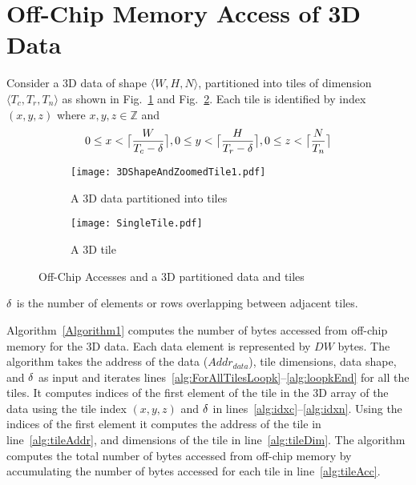\section{Off-Chip Memory Access of 3D Data}\label{sec:Access3DData}
Consider a 3D data of shape $\langle W,H,N\rangle$, partitioned into tiles of dimension $\langle T_c,T_r,T_n\rangle$ as shown in  Fig.~\ref{fig:3dTiledData} and Fig.~\ref{fig:3dTile}. Each tile is identified by index $(x,y,z)$ where $x, y, z \in \mathbb{Z}$ and 
\begin{align}\label{eq:TileIndexing}
	\begin{aligned}
		0\leq x<\ceil[\big]{\frac{W}{T_c-\numOverlap}},
		0\leq y<\ceil[\big]{\frac{H}{T_r-\numOverlap}},
		0\leq z<\ceil[\big]{\frac{N}{T_n}}
	\end{aligned}
\end{align}
\begin{figure}[htb]
	\centering
	\captionsetup{font=sf}
	\begin{subfigure}[t]{0.5\columnwidth}
		\centering
		\texttt{[image: 3DShapeAndZoomedTile1.pdf]}
		\caption{A 3D data partitioned into tiles}
		\label{fig:3dTiledData}
	\end{subfigure}
	\begin{subfigure}[t]{0.4\columnwidth}
		\centering
		\texttt{[image: SingleTile.pdf]}
		\caption{A 3D tile}
		\label{fig:3dTile}
	\end{subfigure}
	\caption{Off-Chip Accesses and a 3D partitioned data and tiles}
	\label{fig:3DPartitionedData}
	\vspace{-1.0em}	
\end{figure}
$\numOverlap$ is the number of elements or rows overlapping between adjacent tiles.

Algorithm~\ref{Algorithm1} computes the number of bytes accessed from off-chip memory for the 3D data. Each data element is represented by $DW$ bytes. The algorithm takes the address of the data ($Addr_{data}$), tile dimensions, data shape, and $\numOverlap$ as input and iterates lines~\ref{alg:ForAllTilesLoopk}--\ref{alg:loopkEnd} for all the tiles. It computes indices of the first element of the tile in the 3D array of the data using the tile index $(x,y,z)$ and $\numOverlap$ in lines~\ref{alg:idxc}--\ref{alg:idxn}. Using the indices of the first element it computes the address of the tile in line~\ref{alg:tileAddr}, and dimensions of the tile in line~\ref{alg:tileDim}. The algorithm computes the total number of bytes accessed from off-chip memory by accumulating the number of bytes accessed for each tile in line~\ref{alg:tileAcc}. 
